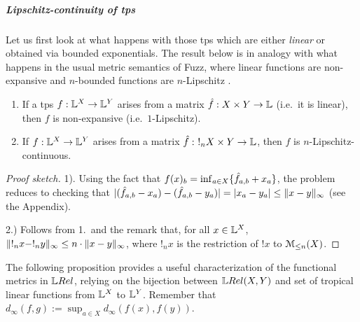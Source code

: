 \subparagraph*{Lipschitz-continuity of tps}\label{sec:4C}%



Let us first look at what happens with those tps which are either \emph{linear} or obtained via bounded exponentials.
The result below is in analogy with what happens in the usual metric semantics of Fuzz, where 
linear functions are non-expansive and $n$-bounded functions are $n$-Lipschitz \cite{Reed2010}.


\begin{proposition}\label{prop:troplinear}
\begin{enumerate}
\item If a tps $f: \mathbb{L}^{X}\to \mathbb{L}^{Y}$ arises from a matrix $\hat{f}:X\times Y\to \mathbb{L}$ (i.e.~it is linear), then $f$ is non-expansive (i.e.\ $1$-Lipschitz).  
\item If  $f: \mathbb{L}^{X}\to \mathbb{L}^{Y}$ arises from a matrix $\hat{f}: \ !_{n}X\times Y\to \mathbb{L}$, then $f$ is $n$-Lipschitz-continuous.
\end{enumerate}
\end{proposition}
\begin{proof}[Proof sketch]
1). Using the fact that $f( x)_{b}= \inf_{a\in X}\{\hat{f}_{a,b}+ x_{a}\}$,
the problem reduces to checking that $|(\hat{f}_{a,b}- x_{a})- (\hat{f}_{a,b}- y_{a})| = |x_{a}- y_{a}|\leq \|  x- y\|_{\infty}$ (see the Appendix).

2.) Follows from 1.~and the remark that, for all $x\in \mathbb{L}^{X}$, $\lVert !_{n} x-!_{n} y\rVert_{\infty}\leq n\cdot \lVert x- y\rVert_{\infty}$, where $!_{n} x$ is the restriction of $! x$ to $\mathcal{M}_{\leq n}(X)$.%
\end{proof} 

The following proposition provides a useful characterization of the functional metrics in $\LREL$, relying on 
the bijection between $\HOM{\LREL}{X}{Y}$ and set of tropical linear functions from $\mathbb{L}^{X}$ to $\mathbb{L}^{Y}$.
Remember that $d_\infty(f,g):=\sup_{a\in X} d_\infty(f(x),f(y))$.

